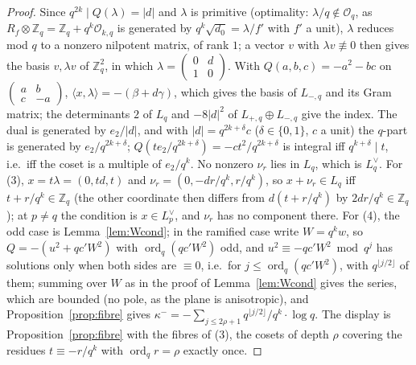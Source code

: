 \documentclass[11pt,reqno]{amsart}
\theoremstyle{plain}
\theoremstyle{definition}
\DeclareMathOperator{\ord}{ord}
\newcommand{\Z}{\mathbb{Z}}
\begin{document}
\begin{proof}
Since $q^{2k}\mid Q(\lambda)=\lvert d\rvert$ and $\lambda$ is primitive (optimality: $\lambda/q\notin
\mathcal O_q$, as $R_f\otimes\Z_q=\Z_q+q^k\mathcal O_{k,q}$ is generated by $q^k\sqrt{d_0}=
\lambda/f'$ with $f'$ a unit), $\lambda$ reduces mod $q$ to a nonzero nilpotent matrix, of rank
$1$; a vector $v$ with $\lambda v\not\equiv0$ then gives the basis $v,\lambda v$ of $\Z_q^2$, in
which $\lambda=\begin{pmatrix}0&d\\1&0\end{pmatrix}$. With $Q(a,b,c)=-a^2-bc$ on $\begin{pmatrix}
a&b\\c&-a\end{pmatrix}$, $\langle x,\lambda\rangle=-(\beta+d\gamma)$, which gives the basis of
$L_{-,q}$ and its Gram matrix; the determinants $2$ of $L_q$ and $-8\lvert d\rvert^2$ of $L_{+,q}
\oplus L_{-,q}$ give the index. The dual is generated by $e_2/\lvert d\rvert$, and with $\lvert d\rvert=q^{2k+\delta}c$
($\delta\in\{0,1\}$, $c$ a unit) the $q$-part is generated by $e_2/q^{2k+\delta}$; $Q(te_2/q^{2k+\delta})
=-ct^2/q^{2k+\delta}$ is integral iff $q^{k+\delta}\mid t$, i.e.\ iff the coset is a multiple of
$e_2/q^k$. No nonzero $\nu_r$ lies in $L_q$, which is $L_q^\vee$.
For (3), $x=t\lambda=(0,td,t)$ and $\nu_r=(0,-dr/q^k,r/q^k)$, so $x+\nu_r\in L_q$ iff $t+r/q^k
\in\Z_q$ (the other coordinate then differs from $d(t+r/q^k)$ by $2dr/q^k\in\Z_q$); at $p\neq q$
the condition is $x\in L_p^\vee$, and $\nu_r$ has no component there. For (4), the odd case is
Lemma~\ref{lem:Wcond}; in the ramified case write $W=q^kw$, so $Q=-(u^2+qc'W^2)$ with $\ord_q(qc'W^2)$
odd, and $u^2\equiv-qc'W^2\bmod q^j$ has solutions only when both sides are $\equiv0$, i.e.\ for
$j\le\ord_q(qc'W^2)$, with $q^{\lfloor j/2\rfloor}$ of them; summing over $W$ as in the proof of
Lemma~\ref{lem:Wcond} gives the series, which are bounded (no pole, as the plane is anisotropic), and
Proposition~\ref{prop:fibre} gives $\kappa^-=-\sum_{j\le2\rho+1}q^{\lfloor j/2\rfloor}/q^k\cdot\log q$.
The display is Proposition~\ref{prop:fibre} with the fibres of (3), the cosets of depth $\rho$
covering the residues $t\equiv-r/q^k$ with $\ord_qr=\rho$ exactly once.
\end{proof}
\end{document}
